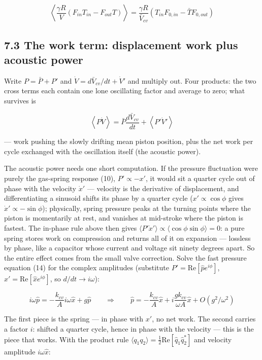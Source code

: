 \documentclass[11pt]{article}
\begin{document}
\[
\left\langle\frac{\gamma R}{V}\left(F_{in}T_{in} - F_{out}T\right)\right\rangle = \frac{\gamma R}{\bar V_{cv}}\left(T_{in}F_{0,in} - \bar TF_{0,out}\right)
\]

\subsection*{7.3 The work term: displacement work plus acoustic power}

Write $P = \bar P + P'$ and $\dot V = d\bar V_{cv}/dt + \dot V'$ and multiply out. Four products: the two cross terms each contain one lone oscillating factor and average to zero; what survives is

\[
\left\langle P\dot V\right\rangle = \bar P\frac{d\bar V_{cv}}{dt} + \left\langle P'\dot V'\right\rangle
\]

--- work pushing the slowly drifting mean piston position, plus the net work per cycle exchanged with the oscillation itself (the acoustic power).

The acoustic power needs one short computation. If the pressure fluctuation were purely the gas-spring response (10), $P' \propto -x'$, it would sit a quarter cycle out of phase with the velocity $\dot x'$ --- velocity is the derivative of displacement, and differentiating a sinusoid shifts its phase by a quarter cycle ($x' \propto \cos\phi$ gives $\dot x' \propto -\sin\phi$); physically, spring pressure peaks at the turning points where the piston is momentarily at rest, and vanishes at mid-stroke where the piston is fastest. The in-phase rule above then gives $\langle P'\dot x'\rangle \propto \langle\cos\phi\sin\phi\rangle = 0$: a pure spring stores work on compression and returns all of it on expansion --- lossless by phase, like a capacitor whose current and voltage sit ninety degrees apart. So the entire effect comes from the small valve correction. Solve the fast pressure equation (14) for the complex amplitudes (substitute $P' = \mathrm{Re}[\hat pe^{i\phi}]$, $x' = \mathrm{Re}[\hat xe^{i\phi}]$, so $d/dt \to i\omega$):

\[
i\omega\hat p = -\frac{k_{cv}}{A}i\omega\hat x + g\hat p \qquad\Longrightarrow\qquad \hat p = -\frac{k_{cv}}{A}\hat x + i\frac{gk_{cv}}{\omega A}\hat x + O(g^2/\omega^2)
\]

The first piece is the spring --- in phase with $x'$, no net work. The second carries a factor $i$: shifted a quarter cycle, hence in phase with the velocity --- this is the piece that works. With the product rule $\langle q_1q_2\rangle = \frac{1}{2}\mathrm{Re}[\hat q_1\hat q_2^*]$ and velocity amplitude $i\omega\hat x$:
\end{document}
